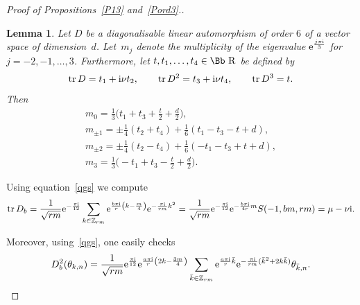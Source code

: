 \documentclass[10pt,a4paper]{amsart}
\newcommand\RR{{\mbox{\Bb R}}}
\newcommand\Z{{\mathbb Z}}
\newcommand{\tr}{\mathop{{\rm tr}}}
\numberwithin{equation}{section}
\newtheorem{Lemma}[Theorem]{Lemma}
\begin{document}
\begin{proof}[Proof of Propositions~\ref{P13} and~\ref{Pord3}.]
\begin{Lemma}\label{LD6}
Let $D$ be a diagonalisable linear automorphism of order $6$ of a vector space of dimension~$d$. Let~$m_j$ denote the multiplicity of the eigenvalue ${\rm e}^{\frac{j \pi {\rm i}}3}$ for $j=-2,-1,\dots,3$. Furthermore, let $t, t_1,\dots,t_4\in \RR$ be defined by
\begin{gather*}
\tr D= t_1+{\rm i}\nu t_2,\qquad \tr D^2= t_3+{\rm i}\nu t_4,\qquad \tr D^3=t.
\end{gather*}
Then
\begin{gather*}
m_0 = \frac13 \bigg(t_1+t_3+\frac t2+\frac d2 \bigg),\\[0.4ex]
m_{\pm1} = \pm\frac 14(t_2+t_4) +\frac16 (t_1-t_3-t+d),\\[0.4ex]
m_{\pm2} = \pm\frac 14(t_2-t_4) +\frac16 (-t_1-t_3+t+d),\\[0.4ex]
m_3 = \frac13 \bigg({-}t_1+t_3-\frac t2+\frac d2 \bigg).
\end{gather*}
\end{Lemma}
%
Using equation~\eqref{qgs} we compute
\begin{gather*}
\tr D_b= \frac1{\sqrt{rm}} {\rm e}^{-\frac {\pi {\rm i}}{12}}\sum_{k\in\Z_{rm}} {\rm e}^{\frac{b\pi {\rm i}}r\left(k-\frac m4\right)} {\rm e}^{-\frac{\pi {\rm i}}{rm}k^2}
= \frac1{\sqrt{rm}} {\rm e}^{-\frac {\pi {\rm i}}{12}} {\rm e}^{-\frac{b\pi {\rm i}}{4r}m}S(-1,bm,rm)
=\mu-\nu {\rm i}.
\end{gather*}

Moreover, using~\eqref{qgs}, one easily checks
\begin{gather*}
D_b^2(\theta_{k,n})=\frac1{\sqrt{rm}} {\rm e}^{\frac {\pi {\rm i}}{12}}{\rm e}^{\frac{a\pi {\rm i}}r\left(2k-\frac {3m}4\right)}\sum_{\bar k\in \Z_{rm}} {\rm e}^{\frac{a\pi {\rm i}}r \bar k } {\rm e}^{-\frac{\pi {\rm i}}{rm} (\bar k^2+2k\bar k) }\theta_{\bar k,n}.
\end{gather*}


\end{proof}
\end{document}
